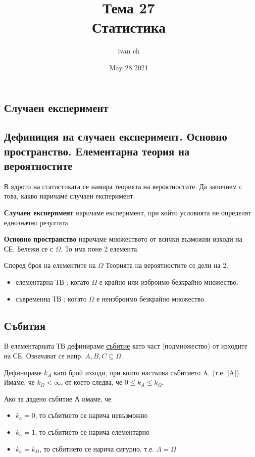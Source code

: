 \documentclass[fleqn,12pt]{article}
\title{Тема 27\\ Статистика}
\author{ivan ch}
\date{May 28 2021}
\begin{document}
\maketitle

\tableofcontents

\begin{justify}

\section{Случаен експеримент}
\subsection{Дефиниция на случаен експеримент. Основно пространство. Елементарна теория на вероятностите}
В ядрото на статистиката се намира теорията на вероятностите. Да започнем с това, какво наричаме случаен експеримент. 

\textbf{Случаен експеримент} наричаме експеримент, при който условията не определят еднозначно резултата.

\textbf{Основно пространство} наричаме множеството от всички възможни изходи на СЕ. Бележи се с $\Omega$. То има поне 2
елемента. 

Според броя на елементите на $\Omega$ Теорията на вероятностите се дели на 2.
\begin{itemize}
    \item елементарна ТВ : когато $\Omega$ е крайно или изброимо безкрайно множество.
    \item съвременна ТВ : когато $\Omega$ е неизброимо безкрайно множество.
\end{itemize}

\subsection{Събития}
В елементарната ТВ дефинираме \underline{събитие} като част (подмножество) от изходите на СЕ. Означават се напр.
$A, B, C \subseteq \Omega$.

Дефинираме $k_A$ като брой изходи, при които настъпва събитието A. (т.е. |A|). Имаме, че $k_\Omega < \infty$, от 
което следва, че $0 \leq k_A \leq k_\Omega$.

Ако за дадено събитие А имаме, че 
\begin{itemize}
    \item $k_a = 0$, то събитието се нарича невъзможно
    \item $k_a = 1$, то събитието се нарича елементарно
    \item $k_a = k_\Omega$, то събитието се нарича сигурно, т.е. $A = \Omega$
\end{itemize}


\end{justify}
\end{document}
